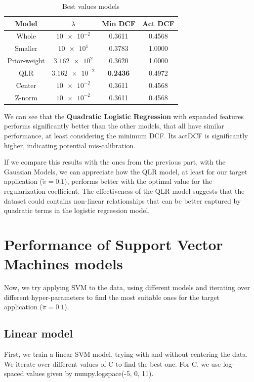 \documentclass[12pt, a4paper]{article}
\begin{document}
\begin{table}[ht!]
	\centering
 	\begin{tabular}{| | c c c c | |} 
 		\hline
 		Model & $\lambda$ & Min DCF & Act DCF\\
 		\hline\hline
 		Whole & $\num{10e-2}$ & 0.3611 & 0.4568\\
 		\hline
 		Smaller & $\num{10e1}$ & 0.3783 & 1.0000\\
 		\hline
 		Prior-weight & $\num{3.162e2}$ & 0.3620 & 1.0000\\
 		\hline
 		QLR & $\num{3.162e-2}$  & \textbf{0.2436} & 0.4972\\
 		\hline
 		Center & $\num{10e-2}$ & 0.3611 & 0.4568\\
 		\hline
 		Z-norm & $\num{10e-2}$ & 0.3611 & 0.4568\\
 		\hline
 	\end{tabular}
	\caption{Best values models}
\end{table}

We can see that the \textbf{Quadratic Logistic Regression} with expanded features performs significantly better than the other models, that all have similar performance, at least considering the minimum DCF. Its actDCF is significantly higher, indicating potential mis-calibration.

If we compare this results with the ones from the previous part, with the Gaussian Models, we can appreciate how the QLR model, at least for our target application ($\tilde{\pi} = 0.1$), performs better with the optimal value for the regularization coefficient. The effectiveness of the QLR model suggests that the dataset could contains non-linear relationships that can be better captured by quadratic terms in the logistic regression model.


\section{Performance of Support Vector Machines models}
Now, we try applying SVM to the data, using different models and iterating over different hyper-parameters to find the most suitable ones for the target application ($\tilde{\pi} = 0.1$).


\subsection{Linear model}
First, we train a linear SVM model, trying with and without centering the data. We iterate over different values of C to find the best one. For C, we use log-spaced values given by numpy.logspace(-5, 0, 11).
\end{document}
